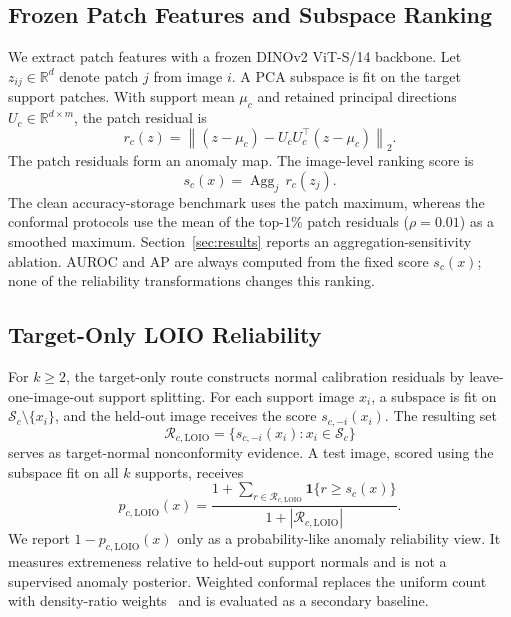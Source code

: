 \subsection{Frozen Patch Features and Subspace Ranking}
We extract patch features with a frozen DINOv2 ViT-S/14 backbone. Let $z_{ij}\in\mathbb{R}^{d}$ denote patch $j$ from image $i$. A PCA subspace is fit on the target support patches. With support mean $\mu_c$ and retained principal directions $U_c\in\mathbb{R}^{d\times m}$, the patch residual is
\begin{equation}\label{eq:residual}
    r_c(z)=\left\|(z-\mu_c)-U_cU_c^{\top}(z-\mu_c)\right\|_2.
\end{equation}
The patch residuals form an anomaly map. The image-level ranking score is
\begin{equation}\label{eq:score}
    s_c(x)=\operatorname{Agg}_{j}\,r_c(z_j).
\end{equation}
The clean accuracy-storage benchmark uses the patch maximum, whereas the conformal protocols use the mean of the top-$1\%$ patch residuals ($\rho=0.01$) as a smoothed maximum. Section~\ref{sec:results} reports an aggregation-sensitivity ablation. AUROC and AP are always computed from the fixed score $s_c(x)$; none of the reliability transformations changes this ranking.

\subsection{Target-Only LOIO Reliability}
For $k\geq2$, the target-only route constructs normal calibration residuals by leave-one-image-out support splitting. For each support image $x_i$, a subspace is fit on $\mathcal{S}_c\setminus\{x_i\}$, and the held-out image receives the score $s_{c,-i}(x_i)$. The resulting set
\begin{equation}\label{eq:rloio}
    \mathcal{R}_{c,\mathrm{LOIO}}
    =\{s_{c,-i}(x_i):x_i\in\mathcal{S}_c\}
\end{equation}
serves as target-normal nonconformity evidence. A test image, scored using the subspace fit on all $k$ supports, receives
\begin{equation}\label{eq:loio}
    p_{c,\mathrm{LOIO}}(x)
    =\frac{1+\sum_{r\in\mathcal{R}_{c,\mathrm{LOIO}}}
    \mathbf{1}\{r\geq s_c(x)\}}
    {1+|\mathcal{R}_{c,\mathrm{LOIO}}|}.
\end{equation}
We report $1-p_{c,\mathrm{LOIO}}(x)$ only as a probability-like anomaly reliability view. It measures extremeness relative to held-out support normals and is not a supervised anomaly posterior. Weighted conformal replaces the uniform count with density-ratio weights~\cite{tibshirani2019covariate} and is evaluated as a secondary baseline.

